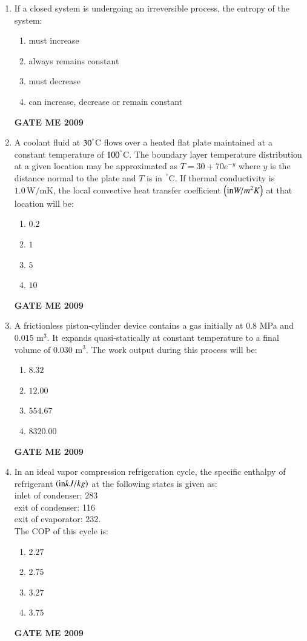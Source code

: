 \documentclass[journal]{IEEEtran}
\begin{document}
\begin{enumerate}[leftmargin=0pt]
\item If a closed system is undergoing an irreversible process, the entropy of the system:
  \begin{enumerate}[label=(\alph*)]
    \item must increase
    \item always remains constant
    \item must decrease
    \item can increase, decrease or remain constant
  \end{enumerate}
  \hfill{\textbf{GATE ME 2009}}

\item A coolant fluid at $30^\degree$C flows over a heated flat plate maintained at a constant temperature of $100^\degree$C. The boundary layer temperature distribution at a given location may be approximated as $T = 30 + 70 e^{-y}$ where $y$  is the distance normal to the plate and $T$ is in $^\degree$C. If thermal conductivity is $1.0\,\mathrm{W/mK}$, the local convective heat transfer coefficient $\left(\text{in} W/m^2K\right)$ at that location will be:
  \begin{enumerate}[label=(\alph*)]
    \item $0.2$
    \item $1$
    \item $5$
    \item $10$
  \end{enumerate}
  \hfill{\textbf{GATE ME 2009}}

\item A frictionless piston-cylinder device contains a gas initially at $0.8$ MPa and $0.015$ m$^3$. It expands quasi-statically at constant temperature to a final volume of $0.030$ m$^3$. The work output  during this process will be:
  \begin{enumerate}[label=(\alph*)]
    \item $8.32$
    \item $12.00$
    \item $554.67$
    \item $8320.00$
  \end{enumerate}
  \hfill{\textbf{GATE ME 2009}}

\item In an ideal vapor compression refrigeration cycle, the specific enthalpy of refrigerant $\left(\text{in} kJ/kg\right)$ at the following states is given as: \\inlet of condenser: 283 \\exit of condenser: 116\\ exit of evaporator: 232.\\ The COP of this cycle is:
  \begin{enumerate}[label=(\alph*)]
    \item $2.27$
    \item $2.75$
    \item $3.27$
    \item $3.75$
  \end{enumerate}
  \hfill{\textbf{GATE ME 2009}}


\end{enumerate}
\end{document}
